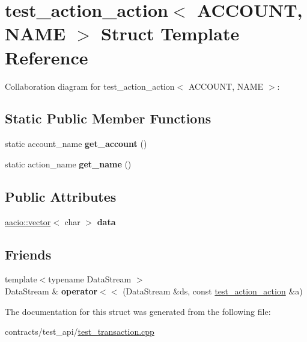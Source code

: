 \hypertarget{structtest__action__action}{}\section{test\+\_\+action\+\_\+action$<$ A\+C\+C\+O\+U\+NT, N\+A\+ME $>$ Struct Template Reference}
\label{structtest__action__action}


Collaboration diagram for test\+\_\+action\+\_\+action$<$ A\+C\+C\+O\+U\+NT, N\+A\+ME $>$\+:
\subsection*{Static Public Member Functions}
\begin{DoxyCompactItemize}
\item 
\mbox{\label{structtest__action__action_ae907a8e53ddca16951743314f7b3c294}} 
static account\+\_\+name {\bfseries get\+\_\+account} ()
\item 
\mbox{\label{structtest__action__action_a6d00cd68b46f76ea57c306e8c9027dea}} 
static action\+\_\+name {\bfseries get\+\_\+name} ()
\end{DoxyCompactItemize}
\subsection*{Public Attributes}
\begin{DoxyCompactItemize}
\item 
\mbox{\label{structtest__action__action_a7b2fb7c05ecf5cde1b8b1891721b3ff4}} 
\mbox{\hyperlink{classstd_1_1vector}{aacio\+::vector}}$<$ char $>$ {\bfseries data}
\end{DoxyCompactItemize}
\subsection*{Friends}
\begin{DoxyCompactItemize}
\item 
\mbox{\label{structtest__action__action_a1654a75d2e06be909777dc865bfc5ddb}} 
{\footnotesize template$<$typename Data\+Stream $>$ }\\Data\+Stream \& {\bfseries operator$<$$<$} (Data\+Stream \&ds, const \mbox{\hyperlink{structtest__action__action}{test\+\_\+action\+\_\+action}} \&a)
\end{DoxyCompactItemize}


The documentation for this struct was generated from the following file\+:\begin{DoxyCompactItemize}
\item 
contracts/test\+\_\+api/\mbox{\hyperlink{test__transaction_8cpp}{test\+\_\+transaction.\+cpp}}\end{DoxyCompactItemize}
